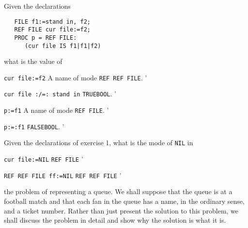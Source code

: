 \begin{exercise}
\item Given the declarations
\begin{verbatim}
   FILE f1:=stand in, f2;
   REF FILE cur file:=f2;
   PROC p = REF FILE:
      (cur file IS f1|f1|f2)
\end{verbatim}
\noindent
what is the value of
\begin{subex}
\item \verb|cur file:=f2| \subans A name of mode \verb|REF REF FILE|.
'
\item \verb|cur file :/=: stand in|
\subans \verb|TRUE|\qquad\verb|BOOL|.
'
\item \verb|p:=f1| \subans A name of mode \verb|REF FILE|.
'
\item \verb|p:=:f1| \subans \verb|FALSE|\qquad\verb|BOOL|.
'
\end{subex}
\item Given the declarations of exercise 1, what is the mode of
\verb|NIL| in
\begin{subex}
\item \verb|cur file:=NIL| \subans \verb|REF FILE|
'
\item \verb|REF REF FILE ff:=NIL| \subans \verb|REF REF FILE|
'
\end{subex}
\end{exercise}

 the problem of representing a queue.  We shall
suppose that the queue is at a football match and that each fan in the
queue has a name, in the ordinary sense, and a ticket number.  Rather
than just present the solution to this problem, we shall discuss the
problem in detail and show why the solution is what it is.

